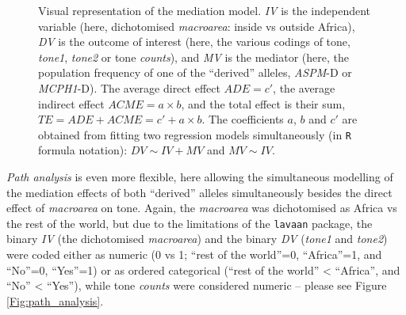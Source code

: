 \documentclass[twoside,onecolumn]{article}
\begin{document}
\begin{figure}[h]
  \centering


  \caption{Visual representation of the mediation model. \textit{IV} is the independent variable (here, dichotomised \textit{macroarea}: inside vs outside Africa), \textit{DV} is the outcome of interest (here, the various codings of tone, \textit{tone1}, \textit{tone2} or tone \textit{counts}), and \textit{MV} is the mediator (here, the population frequency of one of the ``derived'' alleles, \textit{ASPM}-D or \textit{MCPH1}-D). The average direct effect $ADE = c'$, the average indirect effect $ACME = a \times b$, and the total effect is their sum, $TE = ADE + ACME = c' + a \times b$. The coefficients $a$, $b$ and $c'$ are obtained from fitting two regression models simultaneously (in \texttt{R} formula notation): $DV \sim IV + MV$ and $MV \sim IV$.}
  \label{Fig:mediation_analysis}
\end{figure}

\emph{Path analysis} \citep{kline_principles_2011} is even more flexible, here allowing the simultaneous modelling of the mediation effects of both ``derived'' alleles simultaneously besides the direct effect of \textit{macroarea} on tone.
Again, the \textit{macroarea} was dichotomised as Africa vs the rest of the world, but due to the limitations of the \texttt{lavaan} package, the binary \textit{IV} (the dichotomised \textit{macroarea}) and the binary \textit{DV} (\textit{tone1} and \textit{tone2}) were coded either as numeric (0 vs 1; ``rest of the world''=0, ``Africa''=1, and ``No''=0, ``Yes''=1) or as ordered categorical (``rest of the world'' < ``Africa'', and ``No'' < ``Yes''), while tone \textit{counts} were considered numeric -- please see Figure \ref{Fig:path_analysis}.
\end{document}

